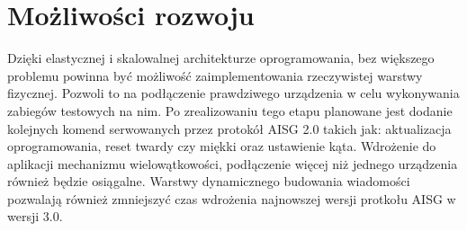     \section{Możliwości rozwoju}
    Dzięki elastycznej i skalowalnej architekturze oprogramowania, bez większego problemu powinna być możliwość zaimplementowania rzeczywistej
    warstwy fizycznej. Pozwoli to na podłączenie prawdziwego urządzenia w celu wykonywania zabiegów testowych na nim. Po zrealizowaniu
    tego etapu planowane jest dodanie kolejnych komend serwowanych przez protokół AISG 2.0 takich jak: aktualizacja oprogramowania, 
    reset twardy czy miękki oraz ustawienie kąta. Wdrożenie do aplikacji mechanizmu wielowątkowości, podłączenie więcej niż jednego urządzenia również będzie osiągalne.
    Warstwy dynamicznego budowania wiadomości pozwalają również zmniejszyć czas wdrożenia najnowszej wersji protkołu AISG w wersji 3.0.

\let\cleardoublepage\clearpage